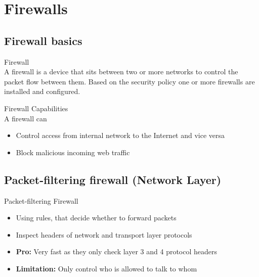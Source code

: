 \section{Firewalls}

\subsection{Firewall basics}

\begin{definition}{Firewall}\\
    A firewall is a device that sits between two or more networks to control the packet flow between them. Based on the security policy one or more firewalls are installed and configured.
\end{definition}

\begin{concept}{Firewall Capabilities}\\
    A firewall can
    \begin{itemize}
        \item Control access from internal network to the Internet and vice versa
        \item Block malicious incoming web traffic
    \end{itemize}
\end{concept}

\subsection{Packet-filtering firewall (Network Layer)}

\begin{definition}{Packet-filtering Firewall}\\
    \begin{itemize}
        \item Using rules, that decide whether to forward packets
        \item Inspect headers of network and transport layer protocols
        \item \textbf{Pro:} Very fast as they only check layer 3 and 4 protocol headers
        \item \textbf{Limitation:} Only control who is allowed to talk to whom
    \end{itemize}
\end{definition}


